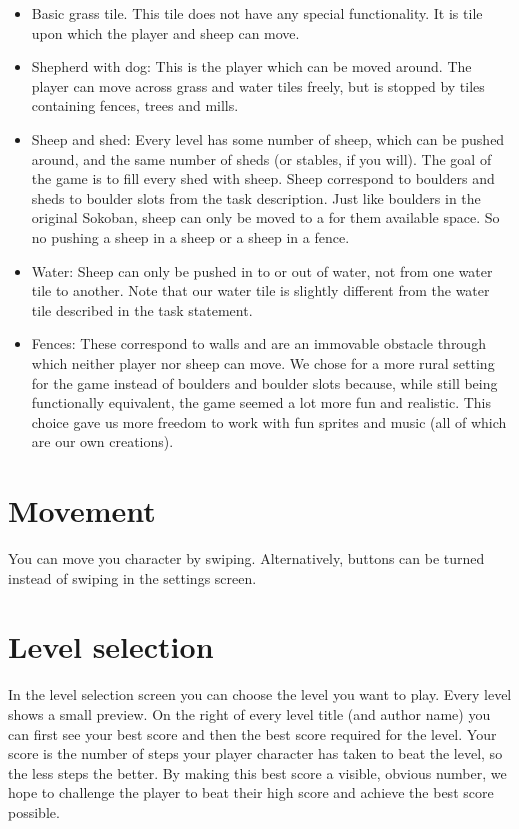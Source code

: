\documentclass{article}
\begin{document}
\begin{itemize}
\item Basic grass tile. This tile does not have any special functionality. It is tile upon which the player and sheep can move.
\item Shepherd with dog: This is the player which can be moved around. The player can move across grass and water tiles freely, but is stopped by tiles containing fences, trees and mills.
\item Sheep and shed: Every level has some number of sheep, which can be pushed around, and the same number of sheds (or stables, if you will). The goal of the game is to fill every shed with sheep. Sheep correspond to boulders and sheds to boulder slots from the task description. Just like boulders in the original Sokoban, sheep can only be moved to a for them available space. So no pushing a sheep in a sheep or a sheep in a fence.
\item Water: Sheep can only be pushed in to or out of water, not from one water tile to another. Note that our water tile is slightly different from the water tile described in the task statement.
\item Fences: These correspond to walls and are an immovable obstacle through which neither player nor sheep can move.
We chose for a more rural setting for the game instead of boulders and boulder slots because, while still being functionally equivalent, the game seemed a lot more fun and realistic. This choice gave us more freedom to work with fun sprites and music (all of which are our own creations).
\end{itemize}

\section*{Movement}
You can move you character by swiping. Alternatively, buttons can be turned instead of swiping in the settings screen.

\section*{Level selection}
In the level selection screen you can choose the level you want to play. Every level shows a small preview. On the right of every level title (and author name) you can first see your best score and then the best score required for the level. Your score is the number of steps your player character has taken to beat the level, so the less steps the better. By making this best score a visible, obvious number, we hope to challenge the player to beat their high score and achieve the best score possible.
\end{document}
